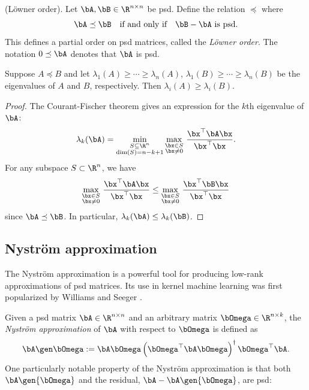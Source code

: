 \begin{definition}{(L\"owner order).}
    Let $\bA, \bB\in\R^{n\times n}$ be psd. Define the
    relation $\preceq$ where
    \[\bA\preceq \bB\quad\text{if and only if}\quad\bB-\bA \text{ is psd}.\]
    This defines a partial order on psd matrices, called the \textit{L\"owner order}. The notation $0\preceq \bA$ denotes that $\bA$ is psd.
\end{definition}


\begin{proposition}
    \label{prop:lowner-eigenvalues}
    Suppose $A\preceq B$ and let $\lambda_1(A)\geq\cdots\geq \lambda_n(A)$, $\lambda_1(B)\geq\cdots\geq \lambda_n(B)$ be the eigenvalues of $A$ and $B$, respectively. Then $\lambda_i(A)\geq \lambda_i(B)$.
\end{proposition}

\begin{proof}
    The Courant-Fischer theorem gives an expression for the $k$th eigenvalue of $\bA$:
    \[
    \lambda_k(\bA) = \min_{\substack{S\subseteq \R^n\\\dim(S)=n-k+1}}\max_{\substack{\bx\in S\\\bx\neq 0}}\,\frac{\bx^\top\bA\bx}{\bx^\top\bx}.
    \]
    For any subspace $S\subset \R^n$, we have
    \[\max_{\substack{\bx\in S\\\bx\neq 0}}\,\frac{\bx^\top\bA\bx}{\bx^\top\bx}\leq \max_{\substack{\bx\in S\\\bx\neq 0}}\,\frac{\bx^\top\bB\bx}{\bx^\top\bx}\]
    since $\bA\preceq \bB$. In particular, $\lambda_k(\bA)\leq \lambda_k(\bB)$.
\end{proof}

\subsection{Nystr\"om approximation}
The Nystr\"om approximation is a powerful tool for producing low-rank approximations of psd matrices. Its use in kernel machine learning was first popularized by Williams and Seeger \cite{williams_using_2000}. 

Given a psd matrix $\bA \in \R^{n\times n}$ and an arbitrary matrix $\bOmega\in\R^{n\times k}$, the \textit{Nystr\"om approximation} of $\bA$ with respect to $\bOmega$ is defined as
\[\bA\gen\bOmega := \bA\bOmega\left(\bOmega^\top\bA\bOmega\right)^\dagger\bOmega^\top\bA.\]
One particularly notable property of the Nystr\"om approximation is that both $\bA\gen{\bOmega}$ and the residual, $\bA - \bA\gen{\bOmega}$, are psd:


